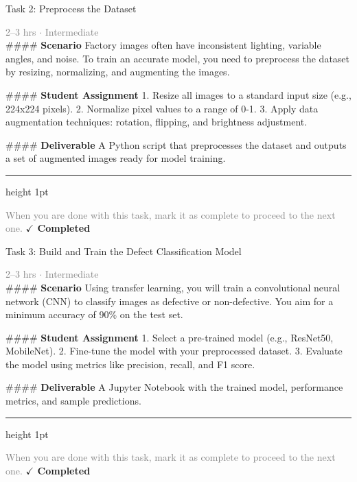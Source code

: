 \documentclass[10pt,a4paper]{article}
\begin{document}
\begin{taskbox}{Task 2: Preprocess the Dataset}

    {\small \textcolor{gray}{2--3 hrs $\cdot$ Intermediate}}\\[12pt]

    \#\#\#\# \textbf{Scenario}  
Factory images often have inconsistent lighting, variable angles, and noise. To train an accurate model, you need to preprocess the dataset by resizing, normalizing, and augmenting the images.  

\#\#\#\# \textbf{Student Assignment}  
1. Resize all images to a standard input size (e.g., 224x224 pixels).  
2. Normalize pixel values to a range of 0-1.  
3. Apply data augmentation techniques: rotation, flipping, and brightness adjustment.  

\#\#\#\# \textbf{Deliverable}  
A Python script that preprocesses the dataset and outputs a set of augmented images ready for model training.\par

    \vspace{16pt}

    \textcolor{cardBorder}{\hrule height 1pt}\vspace{8pt}

    \small \textcolor{gray}{When you are done with this task, mark it as complete to proceed to the next one.} \hfill \textbf{\textcolor{brandDark}{$\checkmark$ Completed}}

\end{taskbox}

\begin{taskbox}{Task 3: Build and Train the Defect Classification Model}

    {\small \textcolor{gray}{2--3 hrs $\cdot$ Intermediate}}\\[12pt]

    \#\#\#\# \textbf{Scenario}  
Using transfer learning, you will train a convolutional neural network (CNN) to classify images as defective or non-defective. You aim for a minimum accuracy of 90\% on the test set.  

\#\#\#\# \textbf{Student Assignment}  
1. Select a pre-trained model (e.g., ResNet50, MobileNet).  
2. Fine-tune the model with your preprocessed dataset.  
3. Evaluate the model using metrics like precision, recall, and F1 score.  

\#\#\#\# \textbf{Deliverable}  
A Jupyter Notebook with the trained model, performance metrics, and sample predictions.\par

    \vspace{16pt}

    \textcolor{cardBorder}{\hrule height 1pt}\vspace{8pt}

    \small \textcolor{gray}{When you are done with this task, mark it as complete to proceed to the next one.} \hfill \textbf{\textcolor{brandDark}{$\checkmark$ Completed}}

\end{taskbox}
\end{document}
